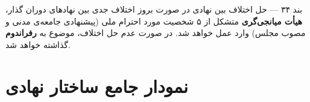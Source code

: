 \documentclass[12pt,a4paper,twoside,openany]{book}
\begin{document}
	\begin{bandbox}{بند ۳۴ --- حل اختلاف بین نهادی}
		در صورت بروز اختلاف جدی بین نهادهای دوران گذار، \textbf{هیأت میانجی‌گری} متشکل
		از ۵ شخصیت مورد احترام ملی (پیشنهادی جامعه‌ی مدنی و مصوب مجلس) وارد عمل خواهد
		شد. در صورت عدم حل اختلاف، موضوع به \textbf{رفراندوم} گذاشته خواهد شد.
	\end{bandbox}
	
	\chapter{نمودار جامع ساختار نهادی}
	\label{ch:structure}
	
	\vspace{0.5\baselineskip}
\end{document}
